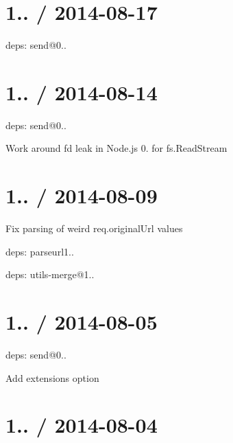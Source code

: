 \section*{1.. / 2014-\/08-\/17 }


\begin{DoxyItemize}
\item deps\+: send@0..
\end{DoxyItemize}

\section*{1.. / 2014-\/08-\/14 }


\begin{DoxyItemize}
\item deps\+: send@0..
\begin{DoxyItemize}
\item Work around {\ttfamily fd} leak in Node.\+js 0. for {\ttfamily fs.\+Read\+Stream}
\end{DoxyItemize}
\end{DoxyItemize}

\section*{1.. / 2014-\/08-\/09 }


\begin{DoxyItemize}
\item Fix parsing of weird {\ttfamily req.\+original\+Url} values
\item deps\+: parseurl1..
\item deps\+: utils-\/merge@1..
\end{DoxyItemize}

\section*{1.. / 2014-\/08-\/05 }


\begin{DoxyItemize}
\item deps\+: send@0..
\begin{DoxyItemize}
\item Add {\ttfamily extensions} option
\end{DoxyItemize}
\end{DoxyItemize}

\section*{1.. / 2014-\/08-\/04 }


